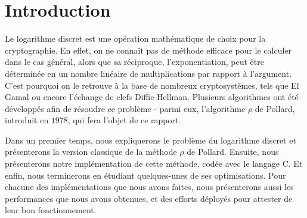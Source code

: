 \chapter*{Introduction}
Le logarithme discret est une opération mathématique de choix pour la cryptographie. En effet, on ne connaît pas de méthode efficace pour le calculer dans le cas général, alors que sa réciproque, l'exponentiation, peut être déterminée en un nombre linéaire de multiplications par rapport à l'argument. C'est pourquoi on le retrouve à la base de nombreux cryptosystèmes, tels que El Gamal ou encore l'échange de clefs Diffie-Hellman. Plusieurs algorithmes ont été développés afin de résoudre ce problème - parmi eux, l'algorithme $\rho$ de Pollard, introduit en $1978$, qui fera l'objet de ce rapport.

Dans un premier temps, nous expliquerons le problème du logarithme discret et présenterons la version classique de la méthode $\rho$ de Pollard. Ensuite, nous présenterons notre implémentation de cette méthode, codée avec le langage C. Et enfin, nous terminerons en étudiant quelques-unes de ses optimisations. Pour chacune des implémentations que nous avons faites, nous présenterons aussi les performances que nous avons obtenues, et des efforts déployés pour attester de leur bon fonctionnement.
